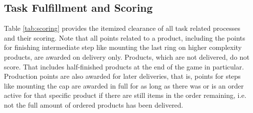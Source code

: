 \documentclass[12pt,twoside]{article}
\begin{document}
\subsection{Task Fulfillment and Scoring}
Table \ref{tab:scoring} provides the itemized clearance of all task
related processes and their scoring. Note that all points related to a
product, including the points for finishing intermediate step like
mounting the last ring on higher complexity products, are awarded on
delivery only. Products, which are not delivered, do not score. That
includes half-finished products at the end of the game in particular.
Production points are also awarded for later deliveries, that is,
points for steps like mounting the cap are awarded in full for as long
as there was or is an order active for that specific product if there
are still items in the order remaining, i.e. not the full amount of
ordered products has been delivered.
\end{document}
